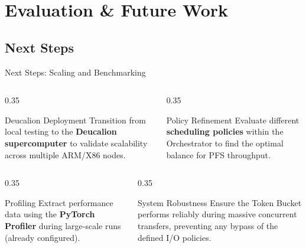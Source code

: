\documentclass[handout]{beamer}
\begin{document}
\section{Evaluation \& Future Work}

\subsection{Next Steps}
\begin{frame}{Next Steps: Scaling and Benchmarking}
    \centering
    \small

    \begin{columns}[t]
        \begin{column}{0.35\textwidth}
            \begin{block}{Deucalion Deployment}
                \footnotesize Transition from local testing to the \textbf{Deucalion supercomputer} to validate scalability across multiple ARM/X86 nodes.
            \end{block}
        \end{column}
        \begin{column}{0.35\textwidth}
            \begin{block}{Policy Refinement}
                \footnotesize Evaluate different \textbf{scheduling policies} within the Orchestrator to find the optimal balance for PFS throughput.
            \end{block}
        \end{column}
    \end{columns}

    \vspace{1em}

    \begin{columns}[t]
        \begin{column}{0.35\textwidth}
            \begin{block}{Profiling}
                \footnotesize Extract performance data using the \textbf{PyTorch Profiler} during large-scale runs (already configured).
            \end{block}
        \end{column}
        \begin{column}{0.35\textwidth}
            \begin{block}{System Robustness}
                \footnotesize Ensure the Token Bucket performs reliably during massive concurrent transfers, preventing any bypass of the defined I/O policies.
            \end{block}
        \end{column}
    \end{columns}
\end{frame}

\frame{\titlepage}
\end{document}
